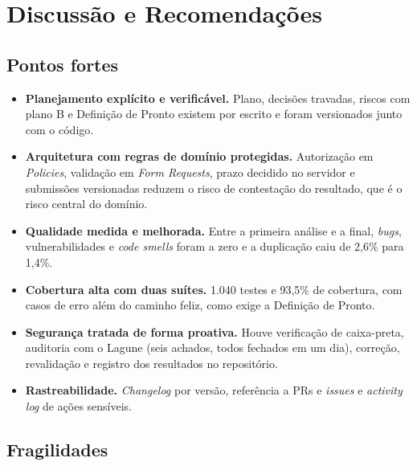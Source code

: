 \section{Discussão e Recomendações}
\label{sec:disc}

\subsection{Pontos fortes}

\begin{itemize}
  \item \textbf{Planejamento explícito e verificável.} Plano, decisões travadas, riscos com plano B e Definição de Pronto existem por escrito e foram versionados junto com o código.
  \item \textbf{Arquitetura com regras de domínio protegidas.} Autorização em \textit{Policies}, validação em \textit{Form Requests}, prazo decidido no servidor e submissões versionadas reduzem o risco de contestação do resultado, que é o risco central do domínio.
  \item \textbf{Qualidade medida e melhorada.} Entre a primeira análise e a final, \textit{bugs}, vulnerabilidades e \textit{code smells} foram a zero e a duplicação caiu de 2,6\% para 1,4\%.
  \item \textbf{Cobertura alta com duas suítes.} 1.040 testes e 93,5\% de cobertura, com casos de erro além do caminho feliz, como exige a Definição de Pronto.
  \item \textbf{Segurança tratada de forma proativa.} Houve verificação de caixa-preta, auditoria com o Lagune (seis achados, todos fechados em um dia), correção, revalidação e registro dos resultados no repositório.
  \item \textbf{Rastreabilidade.} \textit{Changelog} por versão, referência a PRs e \textit{issues} e \textit{activity log} de ações sensíveis.
\end{itemize}

\subsection{Fragilidades}

